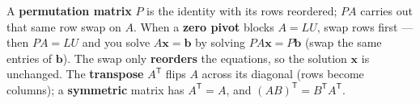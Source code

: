 \documentclass[10pt]{article}
\begin{document}
\vspace{0.10in}

\begin{remindbox}
\small A \textbf{permutation matrix} $P$ is the identity with its rows reordered; $PA$ carries out that
same row swap on $A$. When a \textbf{zero pivot} blocks $A=LU$, swap rows first --- then $PA=LU$ and you
solve $A\mathbf{x}=\mathbf{b}$ by solving $PA\mathbf{x}=P\mathbf{b}$ (swap the same entries of
$\mathbf{b}$). The swap only \textbf{reorders} the equations, so the solution $\mathbf{x}$ is unchanged.
The \textbf{transpose} $A^{\mathsf{T}}$ flips $A$ across its diagonal (rows become columns); a
\textbf{symmetric} matrix has $A^{\mathsf{T}}=A$, and $(AB)^{\mathsf{T}}=B^{\mathsf{T}}A^{\mathsf{T}}$.
\end{remindbox}
\end{document}
